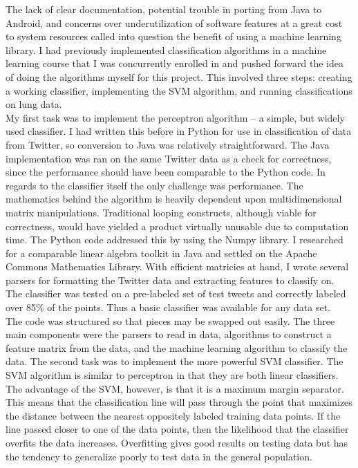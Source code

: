 \documentclass{article}
\begin{document}
 The lack of clear documentation, potential trouble in porting from Java to Android, and concerns over underutilization of software features at a great cost to system resources called into question the benefit of using a machine learning library. I had previously implemented classification algorithms in a machine learning course that I was concurrently enrolled in and pushed forward the idea of doing the algorithms myself for this project. This involved three steps: creating a working classifier, implementing the SVM algorithm, and running classifications on lung data.\\
 
 My first task was to implement the perceptron algorithm -- a simple, but widely used classifier. I had written this before in Python for use in classification of data from Twitter, so conversion to Java was relatively straightforward. The Java implementation was ran on the same Twitter data as a check for correctness, since the performance should have been comparable to the Python code. In regards to the classifier itself the only challenge was performance. The mathematics behind the algorithm is heavily dependent upon multidimensional matrix manipulations. Traditional looping constructs, although viable for correctness, would have yielded a product virtually unusable due to computation time. The Python code addressed this by using the Numpy library. I researched for a comparable linear algebra toolkit in Java and settled on the Apache Commons Mathematics Library. With efficient matricies at hand, I wrote several parsers for formatting the Twitter data and extracting features to classify on. The classifier was tested on a pre-labeled set of test tweets and correctly labeled over 85\% of the points. Thus a basic classifier was available for any data set.\\
 
 The code was structured so that pieces may be swapped out easily. The three main components were the parsers to read in data, algorithms to construct a feature matrix from the data, and the machine learning algorithm to classify the data. The second task was to implement the more powerful SVM classifier. The SVM algorithm is similar to perceptron in that they are both linear classifiers. The advantage of the SVM, however, is that it is a maximum margin separator. This means that the classification line will pass through the point that maximizes the distance between the nearest oppositely labeled training data points. If the line passed closer to one of the data points, then the likelihood that the classifier overfits the data increases. Overfitting gives good results on testing data but has the tendency to generalize poorly to test data in the general population.\\
 
\end{document}
